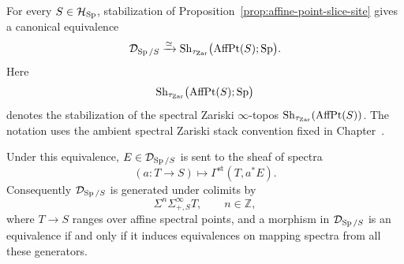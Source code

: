 \begin{proposition}
\label{prop:stable-affine-point-presentation}
For every \(S\in\mathcal H_{\operatorname{Sp}}\), stabilization of
Proposition~\ref{prop:affine-point-slice-site} gives a canonical equivalence
\[
  \mathcal D_{\operatorname{Sp}/S}
  \xrightarrow{\simeq}
  \operatorname{Sh}_{\tau_{\mathrm{Zar}}}
  \bigl(\operatorname{AffPt}(S);\operatorname{Sp}\bigr).
\]
Here
\[
  \operatorname{Sh}_{\tau_{\mathrm{Zar}}}
  \bigl(\operatorname{AffPt}(S);\operatorname{Sp}\bigr)
\]
denotes the stabilization of the spectral Zariski \(\infty\)-topos
\(\operatorname{Sh}_{\tau_{\mathrm{Zar}}}(\operatorname{AffPt}(S))\). The notation uses the ambient spectral Zariski stack convention fixed in
Chapter~.

Under this equivalence, \(E\in\mathcal D_{\operatorname{Sp}/S}\) is sent to the sheaf of spectra
\[
  (a:T\to S)
  \longmapsto
  \Gamma^{\mathrm{st}}(T,a^*E).
\]
Consequently \(\mathcal D_{\operatorname{Sp}/S}\) is generated under colimits by
\[
  \Sigma^n\Sigma^\infty_{+,S}T,
  \qquad n\in\mathbb Z,
\]
where \(T\to S\) ranges over affine spectral points, and a morphism in
\(\mathcal D_{\operatorname{Sp}/S}\) is an equivalence if and only if it induces equivalences on
mapping spectra from all these generators.
\end{proposition}

